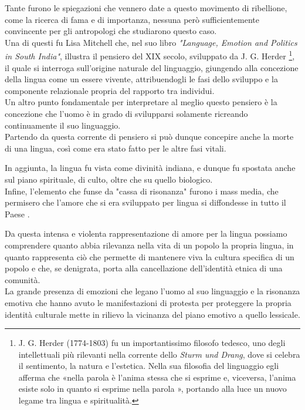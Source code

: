 Tante furono le spiegazioni che vennero date a questo movimento di ribellione, come la ricerca di fama e di importanza, nessuna però sufficientemente convincente per gli antropologi che studiarono questo caso.\\
Una di questi fu Lisa Mitchell che, nel suo libro \textit{"Language, Emotion and Politics in South India"}, illustra il pensiero del XIX secolo, sviluppato da J. G. Herder \footnote{J. G. Herder (1774-1803) fu un importantissimo filosofo tedesco, uno degli intellettuali più rilevanti nella corrente dello \textit{Sturm und Drang}, dove si celebra il sentimento, la natura e l'estetica. Nella sua filosofia del linguaggio egli afferma che «nella parola è l'anima stessa che si esprime e, viceversa, l'anima esiste solo in quanto si esprime nella parola \parencite{Herder}», portando alla luce un nuovo legame tra lingua e spiritualità.}, il quale si interroga sull'origine naturale del linguaggio, giungendo alla concezione della lingua come un essere vivente, attribuendogli le fasi dello sviluppo e la componente relazionale propria del rapporto tra individui.\\
Un altro punto fondamentale per interpretare al meglio questo pensiero è la concezione che l'uomo è in grado di svilupparsi solamente ricreando continuamente il suo linguaggio.\\
Partendo da questa corrente di pensiero si può dunque concepire anche la morte di una lingua, così come era stato fatto per le altre fasi vitali. 

In aggiunta, la lingua fu vista come divinità indiana, e dunque fu spostata anche sul piano spirituale, di culto, oltre che su quello biologico.\\
Infine, l'elemento che funse da "cassa di risonanza" furono i mass media, che permisero che l'amore che si era sviluppato per lingua si diffondesse in tutto il Paese \parencite{language_emotion_politics}. 

Da questa intensa e violenta rappresentazione di amore per la lingua possiamo comprendere quanto abbia rilevanza nella vita di un popolo la propria lingua, in quanto rappresenta ciò che permette di mantenere viva la cultura specifica di un popolo e che, se denigrata, porta alla cancellazione dell'identità etnica di una comunità.\\
La grande presenza di emozioni che legano l'uomo al suo linguaggio e la risonanza emotiva che hanno avuto le manifestazioni di protesta per proteggere la propria identità culturale mette in rilievo la vicinanza del piano emotivo a quello lessicale.

